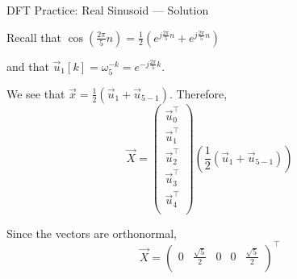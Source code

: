 \begin{frame}{DFT Practice: Real Sinusoid --- Solution}

  Recall that $\cos(\frac{2\pi}{5}n) = \frac{1}{2} \left( e^{j\frac{2\pi}{5}n} + e^{j\frac{2\pi}{5}n} \right)$

  and that $\vec{u}_1[k] = \omega_5^{-k} = e^{-j\frac{2\pi}{5}k}$.

  We see that $\vec{x} = \frac{1}{2}(\vec{u}_1 + \vec{u}_{5-1})$. Therefore,
  \begin{equation*}
    \vec{X} =
    \begin{pmatrix}
      \vec{u}_0^\intercal \\
      \vec{u}_1^\intercal \\
      \vec{u}_2^\intercal \\
      \vec{u}_3^\intercal \\
      \vec{u}_4^\intercal \\
    \end{pmatrix}
    \left( \frac{1}{2} (\vec{u}_1 + \vec{u}_{5-1}) \right)
  \end{equation*}

  Since the vectors are orthonormal,
  \begin{equation*}
    \vec{X} =
    \begin{pmatrix}
      0 &
      \frac{\sqrt{5}}{2} &
      0 &
      0 &
      \frac{\sqrt{5}}{2} \\
    \end{pmatrix}^\intercal
  \end{equation*}

\end{frame}

 
